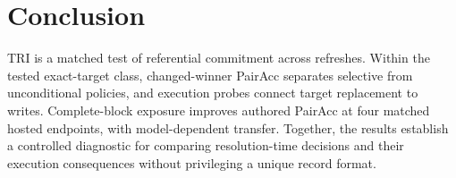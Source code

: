 \documentclass[letterpaper]{article}
\begin{document}
\section{Conclusion}

TRI is a matched test of referential commitment across refreshes. Within the tested exact-target
class, changed-winner PairAcc separates selective from unconditional policies, and execution probes
connect target replacement to writes. Complete-block exposure improves authored PairAcc at four
matched hosted endpoints, with model-dependent transfer. Together, the results establish a
controlled diagnostic for comparing resolution-time decisions and their execution consequences
without privileging a unique record format.

\clearpage
{\small

}
\end{document}
